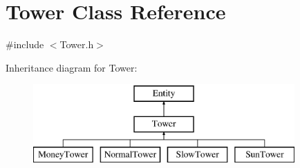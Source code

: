 \hypertarget{class_tower}{\section{Tower Class Reference}
\label{class_tower}
}


{\ttfamily \#include $<$Tower.\+h$>$}

Inheritance diagram for Tower\+:\begin{figure}[H]
\begin{center}
\leavevmode
\includegraphics[height=3.000000cm]{class_tower}
\end{center}
\end{figure}

